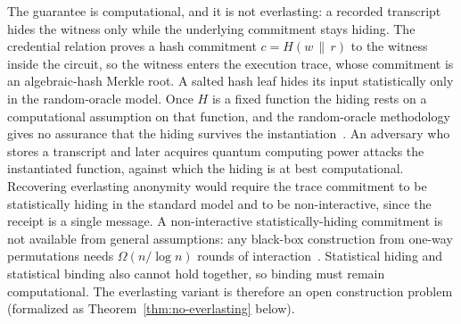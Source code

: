 \begin{remark}\label{rem:everlasting}
    The guarantee is computational, and it is not everlasting: a recorded transcript hides the witness only while the underlying commitment stays hiding. The credential relation proves a hash commitment $c = H(w \,\|\, r)$ to the witness inside the circuit, so the witness enters the execution trace, whose commitment is an algebraic-hash Merkle root. A salted hash leaf hides its input statistically only in the random-oracle model. Once $H$ is a fixed function the hiding rests on a computational assumption on that function, and the random-oracle methodology gives no assurance that the hiding survives the instantiation~\cite{cgh2004rom}. An adversary who stores a transcript and later acquires quantum computing power attacks the instantiated function, against which the hiding is at best computational. Recovering everlasting anonymity would require the trace commitment to be statistically hiding in the standard model and to be non-interactive, since the receipt is a single message. A non-interactive statistically-hiding commitment is not available from general assumptions: any black-box construction from one-way permutations needs $\Omega(n/\log n)$ rounds of interaction~\cite{hhrs2007,wee2007tcc}. Statistical hiding and statistical binding also cannot hold together, so binding must remain computational. The everlasting variant is therefore an open construction problem (formalized as Theorem~\ref{thm:no-everlasting} below).
\end{remark}

